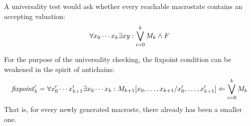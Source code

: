 \documentclass{llncs}
\begin{document}
A universality test would ask whether every reachable macrostate contains an accepting valuation: 
$$
\forall x_0\cdots x_k \exists x y:  \bigvee_{i=0}^k M_k \land F
$$

For the purpose of the universality checking,
the fixpoint condition can be weakened in the spirit of antichains:
$$
\mathit{fixpoint}'_k = \forall x_0'\cdots x_{k+1}'\exists x_0\cdots x_{k} :
M_{k+1}[x_0,\ldots,x_{k+1}/x'_0,\ldots,x'_{k+1}]
\Leftarrow
\bigvee_{i=0}^k M_k 
$$
That is, for every newly generated macroste, there already has been a smaller one.





\end{document}

